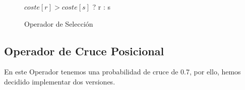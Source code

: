 \begin{figure}[H]
	\centering
	\begin{minipage}{.9\linewidth}
		
		
		
		\begin{algorithm}[H] 
			\SetAlgoLined
			
			
			
			\Return $coste[r]>coste[s]$ ? r : s \;
			
			
		\end{algorithm} 
		
	\end{minipage}
\end{figure}










\begin{figure}[H]
	\centering
	\begin{minipage}{.9\linewidth}
		
		
		
		\begin{algorithm}[H] 
			
			\caption{Operador de Selección}
			\SetAlgoLined
			
			
			
		\end{algorithm} 
		
	\end{minipage}
\end{figure}




\newpage 

\subsection{Operador de Cruce Posicional}

En este Operador tenemos una probabilidad de cruce de 0.7, por ello, hemos decidido implementar dos versiones. 

